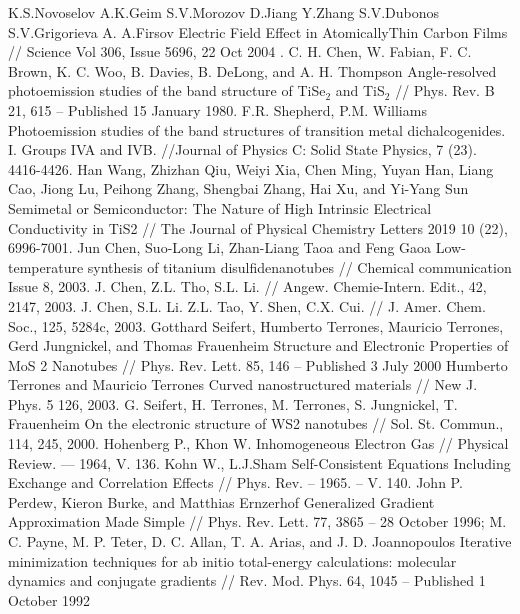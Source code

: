 
\begin{thebibliography}{3}
K.S.Novoselov A.K.Geim S.V.Morozov D.Jiang Y.Zhang S.V.Dubonos S.V.Grigorieva A. A.Firsov Electric Field Effect in AtomicallyThin Carbon Films // Science Vol 306, Issue 5696, 22 Oct 2004 .
 C. H. Chen, W. Fabian, F. C. Brown, K. C. Woo, B. Davies, B. DeLong, and A. H. Thompson
Angle-resolved photoemission studies of the band structure of TiSe$_{2}$ and TiS$_{2}$ // Phys. Rev. B 21, 615 – Published 15 January 1980.
 F.R. Shepherd, P.M. Williams Photoemission studies of the band structures of transition metal dichalcogenides. I. Groups IVA and IVB. //Journal of Physics C: Solid State Physics, 7 (23). 4416-4426.
 Han Wang, Zhizhan Qiu, Weiyi Xia, Chen Ming, Yuyan Han, Liang Cao, Jiong Lu, Peihong Zhang, Shengbai Zhang, Hai Xu, and Yi-Yang Sun Semimetal or Semiconductor: The Nature of High Intrinsic Electrical Conductivity in TiS2 // The Journal of Physical Chemistry Letters 2019 10 (22), 6996-7001.
 Jun Chen, Suo-Long Li, Zhan-Liang Taoa and Feng Gaoa Low-temperature synthesis of titanium disulfidenanotubes //  Chemical communication Issue 8, 2003.
 J. Chen, Z.L. Tho, S.L. Li. // Angew. Chemie-Intern. Edit., 42, 2147, 2003.
 J. Chen, S.L. Li. Z.L. Tao, Y. Shen, C.X. Cui. // J. Amer. Chem. Soc., 125, 5284c, 2003.
 Gotthard Seifert, Humberto Terrones, Mauricio Terrones, Gerd Jungnickel, and Thomas Frauenheim Structure and Electronic Properties of MoS 2 Nanotubes // Phys. Rev. Lett. 85, 146 – Published 3 July 2000
 Humberto Terrones and Mauricio Terrones Curved nanostructured materials // New J. Phys. 5 126, 2003.
 G. Seifert, H. Terrones, M. Terrones, S. Jungnickel, T. Frauenheim On the electronic structure of WS2 nanotubes //  Sol. St. Commun., 114, 245, 2000.
Hohenberg P., Khon W.  Inhomogeneous Electron Gas // Physical Review. --- 1964, V. 136.
Kohn W., L.J.Sham Self-Consistent Equations Including Exchange and Correlation Effects // Phys. Rev. – 1965. – V. 140.
John P. Perdew, Kieron Burke, and Matthias Ernzerhof Generalized Gradient Approximation Made Simple // Phys. Rev. Lett. 77, 3865 – 28 October 1996;
M. C. Payne, M. P. Teter, D. C. Allan, T. A. Arias, and J. D. Joannopoulos Iterative minimization techniques for ab initio total-energy calculations: molecular dynamics and conjugate gradients // Rev. Mod. Phys. 64, 1045 – Published 1 October 1992

\end{thebibliography}
